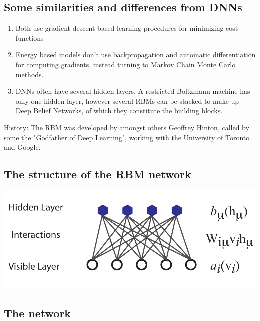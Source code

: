 \documentclass[%
oneside,                 %
final,                   %
10pt]{article}
\begin{document}
\noindent
\subsection{Some similarities and differences from DNNs}

\begin{enumerate}
\item Both use gradient-descent based learning procedures for minimizing cost functions

\item Energy based models don't use backpropagation and automatic differentiation for computing gradients, instead turning to Markov Chain Monte Carlo methods.

\item DNNs often have several hidden layers. A restricted Boltzmann machine has only one hidden layer, however several RBMs can be stacked to make up Deep Belief Networks, of which they constitute the building blocks.
\end{enumerate}

\noindent
History: The RBM was developed by amongst others Geoffrey Hinton, called by some the "Godfather of Deep Learning", working with the University of Toronto and Google.


\subsection{The structure of the RBM network}



\vspace{6mm}

\centerline{\includegraphics[width=1.0\linewidth]{figures/RBM.pdf}}

\vspace{6mm}





\subsection{The network}
\end{document}
